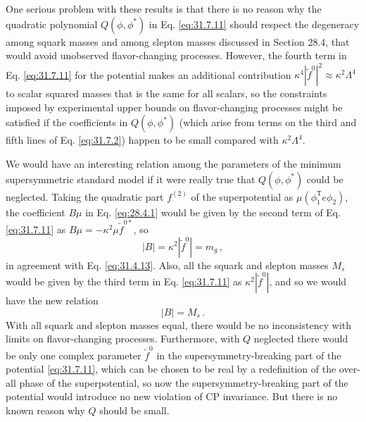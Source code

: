 One serious problem with these results is that there is no reason why the
quadratic polynomial \(Q(\phi,\phi^*)\) in Eq. \eqref{eq:31.7.11} should
respect the degeneracy among squark masses and among slepton masses
discussed in Section 28.4, that would avoid unobserved flavor-changing
processes. However, the fourth term in Eq. \eqref{eq:31.7.11} for the
potential makes an additional contribution
\(\kappa^4|\widetilde f^0|^2\approx\kappa^2\Lambda^4\) to scalar squared
masses that is the same for all scalars, so the constraints imposed by
experimental upper bounds on flavor-changing processes might be satisfied
if the coefficients in \(Q(\phi,\phi^*)\) (which arise from terms on the
third and fifth lines of Eq. \eqref{eq:31.7.2}) happen to be small compared
with \(\kappa^2\Lambda^4\).

We would have an interesting relation among the parameters of the minimum
supersymmetric standard model if it were really true that \(Q(\phi,\phi^*)\)
could be neglected. Taking the quadratic part \(f^{(2)}\) of the
superpotential as \(\mu(\phi_1^{\mathsf T}e\phi_2)\), the coefficient
\(B\mu\) in Eq. \eqref{eq:28.4.1} would be given by the second term of
Eq. \eqref{eq:31.7.11} as
\(B\mu=-\kappa^2\mu\widetilde f^{0*}\), so
\[
  |B|=\kappa^2|\widetilde f^0|=m_g\,,
\]
in agreement with Eq. \eqref{eq:31.4.13}. Also, all the squark and slepton
masses \(M_s\) would be given by the third term in
Eq. \eqref{eq:31.7.11} as \(\kappa^2|\widetilde f^0|\), and so we would have
the new relation
\begin{equation}
  |B|=M_s\,.
  \tag{31.7.12}\label{eq:31.7.12}
\end{equation}
With all squark and slepton masses equal, there would be no inconsistency
with limits on flavor-changing processes. Furthermore, with \(Q\) neglected
there would be only one complex parameter \(\widetilde f^0\) in the
supersymmetry-breaking part of the potential \eqref{eq:31.7.11}, which can
be chosen to be real by a redefinition of the over-all phase of the
superpotential, so now the supersymmetry-breaking part of the potential
would introduce no new violation of CP invariance. But there is no known
reason why \(Q\) should be small.


